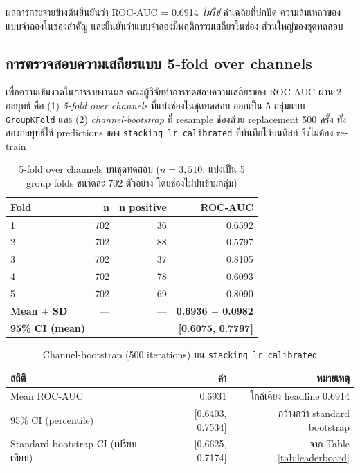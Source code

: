 ผลการกระจายข้างต้นยืนยันว่า ROC-AUC = 0.6914 \emph{ไม่ใช่} ค่าเฉลี่ยที่ปกปิด
ความล้มเหลวของแบบจำลองในช่องสำคัญ และยืนยันว่าแบบจำลองมีพฤติกรรมเสถียรในช่อง
ส่วนใหญ่ของชุดทดสอบ

\subsection{การตรวจสอบความเสถียรแบบ 5-fold over channels}
\label{sec:results-kfold}

เพื่อความเข้มงวดในการรายงานผล คณะผู้วิจัยทำการทดสอบความเสถียรของ ROC-AUC
ผ่าน 2 กลยุทธ์ คือ (1) \emph{5-fold over channels} ที่แบ่งช่องในชุดทดสอบ
ออกเป็น 5 กลุ่มแบบ \texttt{GroupKFold} และ (2) \emph{channel-bootstrap}
ที่ resample ช่องด้วย replacement 500 ครั้ง ทั้งสองกลยุทธ์ใช้ predictions
ของ \texttt{stacking\_lr\_calibrated} ที่บันทึกไว้บนดิสก์ จึงไม่ต้อง re-train

\begin{table}[H]
\centering
\caption{5-fold over channels บนชุดทดสอบ ($n=3{,}510$, แบ่งเป็น 5 group folds
ขนาดละ 702 ตัวอย่าง โดยช่องไม่ปนข้ามกลุ่ม)}
\label{tab:kfold}
\begin{tabularx}{\textwidth}{Xrrr}
\toprule
\textbf{Fold} & \textbf{n} & \textbf{n positive} & \textbf{ROC-AUC} \\
\midrule
1 & 702 & 36 & 0.6592 \\
2 & 702 & 88 & 0.5797 \\
3 & 702 & 37 & 0.8105 \\
4 & 702 & 78 & 0.6093 \\
5 & 702 & 69 & 0.8090 \\
\midrule
\textbf{Mean $\pm$ SD} & --- & --- & \textbf{0.6936 $\pm$ 0.0982} \\
\textbf{95\% CI (mean)} & & & \textbf{[0.6075, 0.7797]} \\
\bottomrule
\end{tabularx}
\end{table}

\begin{table}[H]
\centering
\caption{Channel-bootstrap (500 iterations) บน \texttt{stacking\_lr\_calibrated}}
\label{tab:channel-boot}
\begin{tabularx}{\textwidth}{Xrr}
\toprule
\textbf{สถิติ} & \textbf{ค่า} & \textbf{หมายเหตุ} \\
\midrule
Mean ROC-AUC                          & 0.6931 & ใกล้เคียง headline 0.6914 \\
95\% CI (percentile)                  & [0.6403, 0.7534] & กว้างกว่า standard bootstrap \\
Standard bootstrap CI (เปรียบเทียบ)   & [0.6625, 0.7174] & จาก Table \ref{tab:leaderboard} \\
\bottomrule
\end{tabularx}
\end{table}

